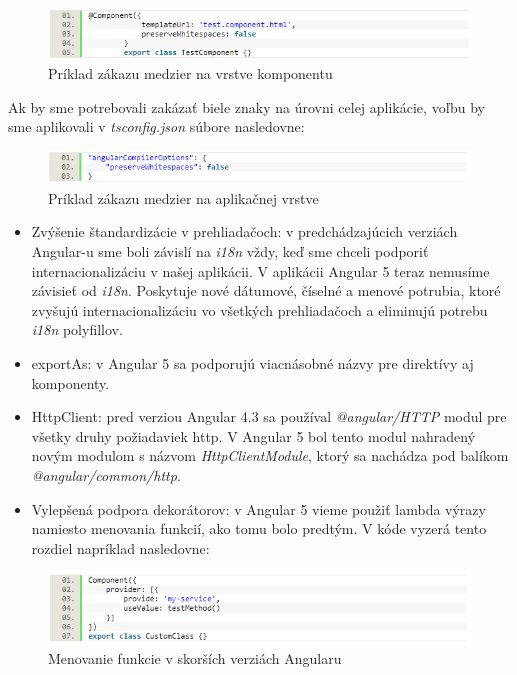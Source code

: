 \begin{figure}[ht]
  \centering
  \includegraphics[width=1\columnwidth]{img/ng5_diff.png}
  \caption{\label{fig:ng_diff} Príklad zákazu medzier na vrstve komponentu}
\end{figure}

Ak by sme potrebovali zakázať biele znaky na úrovni celej aplikácie, voľbu by sme 
aplikovali v \textit{tsconfig.json} súbore nasledovne:

\begin{figure}[ht]
  \centering
  \includegraphics[width=1\columnwidth]{img/ng5_diff_2.png}
  \caption{\label{fig:ng_diff_2} Príklad zákazu medzier na aplikačnej vrstve}
\end{figure}

\begin{itemize}
\item Zvýšenie štandardizácie v prehliadačoch: 
v predchádzajúcich verziách Angular-u sme boli závislí na \textit{i18n} vždy, keď sme chceli podporiť
 internacionalizáciu v našej aplikácii. V aplikácii Angular 5 teraz nemusíme závisieť od \textit{i18n}.
 Poskytuje nové dátumové, číselné a menové potrubia, ktoré zvyšujú internacionalizáciu
 vo všetkých prehliadačoch a eliminujú potrebu \textit{i18n} polyfillov.
\item exportAs: 
v Angular 5 sa podporujú viacnásobné názvy pre direktívy aj komponenty.
\item HttpClient: 
pred verziou Angular 4.3 sa používal \textit{@angular/HTTP} modul pre všetky druhy požiadaviek \acrshort{http}. 
V Angular 5 bol tento modul nahradený novým modulom s názvom \textit{HttpClientModule}, ktorý 
sa nachádza pod balíkom \textit{@angular/common/http}.
\item Vylepšená podpora dekorátorov: 
v Angular 5 vieme použiť lambda výrazy namiesto menovania funkcií, ako tomu bolo predtým. 
V kóde vyzerá tento rozdiel napríklad nasledovne:
\end{itemize}

\begin{figure}[ht]
  \centering
  \includegraphics[width=1\columnwidth]{img/ng5_diff_3.png}
  \caption{\label{fig:ng_diff_3} Menovanie funkcie v skorších verziách Angularu}
\end{figure}

